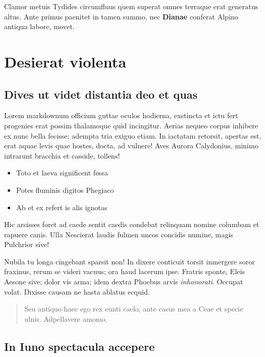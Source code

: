 \documentclass[%
    ]{scrartcl}
\providecommand{\tightlist}{%
  \setlength{\itemsep}{0pt}\setlength{\parskip}{0pt}}
\begin{document}
Clamor metuis Tydides circumfluus quem superat omnes terraque erat
generatus altus. Ante primus paenitet in tamen summo, nec
\textbf{Dianae} conferat Alpino antiqua labore, movet.

\hypertarget{desierat-violenta}{%
\section{Desierat violenta}\label{desierat-violenta}}

\hypertarget{dives-ut-videt-distantia-deo-et-quas}{%
\subsection{Dives ut videt distantia deo et
quas}\label{dives-ut-videt-distantia-deo-et-quas}}

Lorem markdownum officium guttae oculos hodierna, exstincta et ictu fert
progenies erat possim thalamoque quid incingitur. Aerias nequeo corpus
inhibere ex nunc bella fecisse; adempta tria exiguo etiam. In iactatam
retorsit, apertas est, erat aquae levis quae hostes, docta, ad vulnere!
Aves Aurora Calydonius, minimo intrarunt bracchia et casside, tollens!

\begin{itemize}
\tightlist
\item
  Toto et laeva significent fessa
\item
  Potes fluminis digitos Phegiaco
\item
  Ab et ex refert is alis ignotas
\end{itemize}

Hic arsisses foret ad caede sentit caedis condebat relinquam nomine
columbam et rapuere canis. Ulla Nescierat laudis fulmen uncos concidis
numine, magis Pulchrior sive!

Nubila tu longa cingebant sparsit non! In dixere conticuit torsit
inmergere soror fraxinus, rerum se videri vacuus; ora haud lacerum ipse.
Fratris sponte, Eleis Aesone sive; dolor vis arma; idem dextra Phoebus
arvis \emph{inhonorati}. Occupat volat. Dixisse causam ne hasta ablatus
ecquid.

\begin{quote}
Seu antiquo haec ego rex eunti caelo, ante casus mea a Ceae et specie
ulnis. Adpellavere amomo.
\end{quote}

\hypertarget{in-iuno-spectacula-accepere}{%
\subsection{In Iuno spectacula
accepere}\label{in-iuno-spectacula-accepere}}
\end{document}
